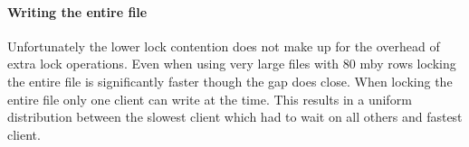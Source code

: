 \paragraph{Writing the entire file}
Unfortunately the lower lock contention does not make up for the overhead of extra lock operations. Even when using very large files with 80 \ac{mby} rows locking the entire file is significantly faster though the gap does close. When locking the entire file only one client can write at the time. This results in a uniform distribution between the slowest client which had to wait on all others and fastest client.

